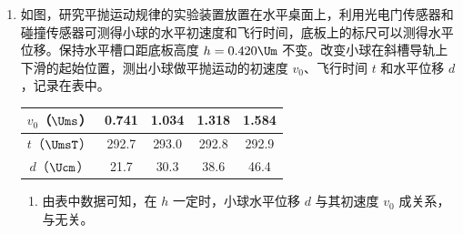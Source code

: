 \documentclass[\gkver]{gaokaozhenti}
\begin{document}
\begin{enumerate}
\begin{enumerate}
	\item
	将待测元件（额定电压 $9\UV$）、蓄电池、滑动变阻器、电流表、多用表、电键及若干导线连接成电路如图（b）所示。添加连线，使电路能测量该元件完整的伏安特性。本实验中使用多用表测电压，多用表的选择开关应调到档（填：“直流电压 $10\UV$”或“直流电压 $50\UV$”）。
\end{enumerate}

\item
如图，研究平抛运动规律的实验装置放置在水平桌面上，利用光电门传感器和碰撞传感器可测得小球的水平初速度和飞行时间，底板上的标尺可以测得水平位移。保持水平槽口距底板高度 $h = 0.420\Um$ 不变。改变小球在斜槽导轨上下滑的起始位置，测出小球做平抛运动的初速度 $v_{0}$、飞行时间 $t$ 和水平位移 $d$，记录在表中。

\begin{center}
\begin{tabular}{|c|c|c|c|c|}
\hline
$v_{0}$（$\Ums$） & 0.741 & 1.034 & 1.318 & 1.584 \\ \hline
$t$（$\UmsT$） & 292.7 & 293.0 & 292.8 & 292.9 \\ \hline
$d$（$\Ucm$） & 21.7 & 30.3 & 38.6 & 46.4 \\ \hline
\end{tabular}
\end{center}

\begin{enumerate}
	\item
	由表中数据可知，在 $h$ 一定时，小球水平位移 $d$ 与其初速度 $v_{0}$ 成关系，与无关。


\end{enumerate}
\end{enumerate}
\end{document}
